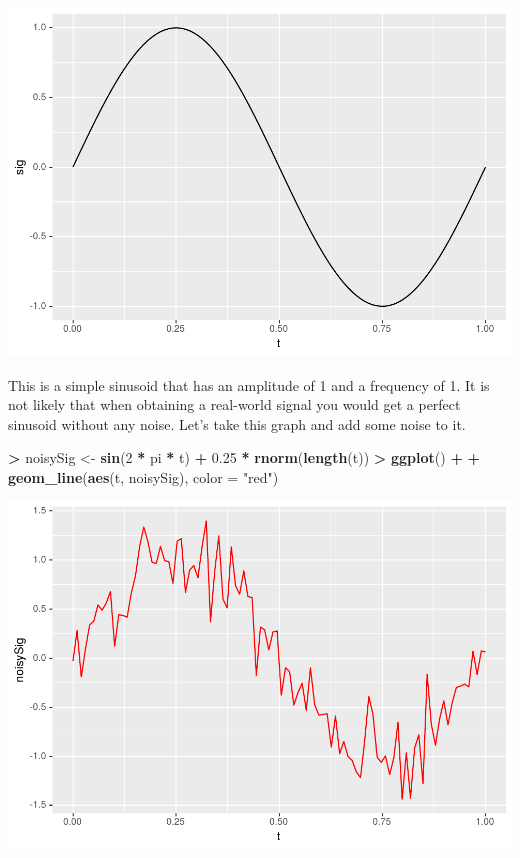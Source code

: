 \documentclass[
]{krantz}
\makeatletter
\newenvironment{Shaded}{\begin{snugshade}}{\end{snugshade}}
\newcommand{\DataTypeTok}[1]{\textcolor[rgb]{0.27,0.27,0.27}{#1}}
\newcommand{\DecValTok}[1]{\textcolor[rgb]{0.06,0.06,0.06}{#1}}
\newcommand{\FloatTok}[1]{\textcolor[rgb]{0.06,0.06,0.06}{#1}}
\newcommand{\KeywordTok}[1]{\textcolor[rgb]{0.27,0.27,0.27}{\textbf{#1}}}
\newcommand{\NormalTok}[1]{#1}
\newcommand{\OperatorTok}[1]{\textcolor[rgb]{0.43,0.43,0.43}{\textbf{#1}}}
\newcommand{\StringTok}[1]{\textcolor[rgb]{0.5,0.5,0.5}{#1}}
\newenvironment{kframe}{%
\medskip{}
\setlength{\fboxsep}{.8em}
 \def\at@end@of@kframe{}%
 \ifinner\ifhmode%
  \def\at@end@of@kframe{\end{minipage}}%
  \begin{minipage}{\columnwidth}%
 \fi\fi%
 \def\FrameCommand##1{\hskip\@totalleftmargin \hskip-\fboxsep
 \colorbox{shadecolor}{##1}\hskip-\fboxsep
     \hskip-\linewidth \hskip-\@totalleftmargin \hskip\columnwidth}%
 \MakeFramed {\advance\hsize-\width
   \@totalleftmargin\z@ \linewidth\hsize
   \@setminipage}}%
 {\par\unskip\endMakeFramed%
 \at@end@of@kframe}
\renewenvironment{Shaded}{\begin{kframe}}{\end{kframe}}
\makeatother
\begin{document}
\includegraphics{bookdown_files/figure-latex/unnamed-chunk-325-1.pdf}

This is a simple sinusoid that has an amplitude of 1 and a frequency of 1. It is not likely that when obtaining a real-world signal you would get a perfect sinusoid without any noise. Let's take this graph and add some noise to it.

\begin{Shaded}
\begin{Highlighting}[]
\OperatorTok{\textgreater{}}\StringTok{ }\NormalTok{noisySig \textless{}{-}}\StringTok{ }\KeywordTok{sin}\NormalTok{(}\DecValTok{2} \OperatorTok{*}\StringTok{ }\NormalTok{pi }\OperatorTok{*}\StringTok{ }\NormalTok{t) }\OperatorTok{+}\StringTok{ }\FloatTok{0.25} \OperatorTok{*}\StringTok{ }\KeywordTok{rnorm}\NormalTok{(}\KeywordTok{length}\NormalTok{(t))}
\OperatorTok{\textgreater{}}\StringTok{ }\KeywordTok{ggplot}\NormalTok{() }\OperatorTok{+}\StringTok{ }
\OperatorTok{+}\StringTok{   }\KeywordTok{geom\_line}\NormalTok{(}\KeywordTok{aes}\NormalTok{(t, noisySig), }\DataTypeTok{color =} \StringTok{"red"}\NormalTok{)}
\end{Highlighting}
\end{Shaded}

\includegraphics{bookdown_files/figure-latex/unnamed-chunk-326-1.pdf}
\end{document}
